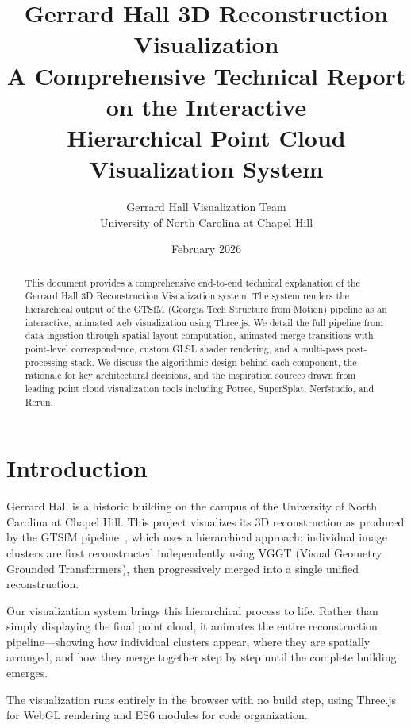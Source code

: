 \documentclass[11pt, letterpaper]{article}
\title{%
    \textbf{Gerrard Hall 3D Reconstruction Visualization} \\[0.5em]
    \large A Comprehensive Technical Report on the Interactive \\
    Hierarchical Point Cloud Visualization System
}
\author{
    Gerrard Hall Visualization Team \\
    University of North Carolina at Chapel Hill
}
\date{February 2026}
\begin{document}
\maketitle

\begin{abstract}
This document provides a comprehensive end-to-end technical explanation of the Gerrard Hall 3D Reconstruction Visualization system. The system renders the hierarchical output of the GTSfM (Georgia Tech Structure from Motion) pipeline as an interactive, animated web visualization using Three.js. We detail the full pipeline from data ingestion through spatial layout computation, animated merge transitions with point-level correspondence, custom GLSL shader rendering, and a multi-pass post-processing stack. We discuss the algorithmic design behind each component, the rationale for key architectural decisions, and the inspiration sources drawn from leading point cloud visualization tools including Potree, SuperSplat, Nerfstudio, and Rerun.
\end{abstract}

\tableofcontents
\newpage

\section{Introduction}

Gerrard Hall is a historic building on the campus of the University of North Carolina at Chapel Hill. This project visualizes its 3D reconstruction as produced by the GTSfM pipeline~\cite{gtsfm}, which uses a hierarchical approach: individual image clusters are first reconstructed independently using VGGT (Visual Geometry Grounded Transformers), then progressively merged into a single unified reconstruction.

Our visualization system brings this hierarchical process to life. Rather than simply displaying the final point cloud, it animates the entire reconstruction pipeline---showing how individual clusters appear, where they are spatially arranged, and how they merge together step by step until the complete building emerges.

The visualization runs entirely in the browser with no build step, using Three.js~\cite{threejs} for WebGL rendering and ES6 modules for code organization.

\end{document}
